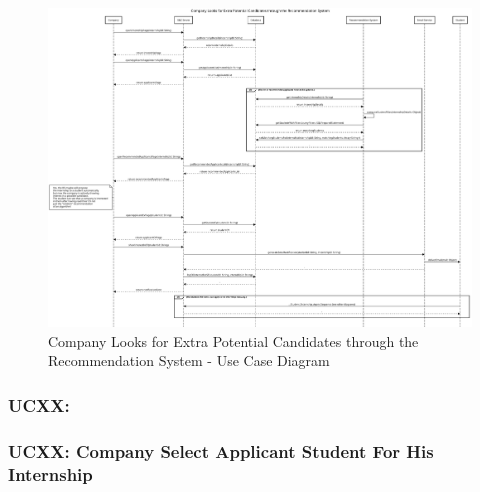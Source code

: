 \begin{figure}
    \centering
    \includegraphics[width=1.0\textwidth]{Images/UC_10.pdf}
    \caption{Company Looks for Extra Potential Candidates through the Recommendation System - Use Case Diagram}
    \label{fig:use-case-diagram-10}
\end{figure}

\subsubsection{UCXX: }
\label{subsubsec:UC_11_TO_MODIFY}

\subsubsection{UCXX: Company Select Applicant Student For His Internship}
\label{subsubsec:company-select-applicant-student-for-his-internship}

